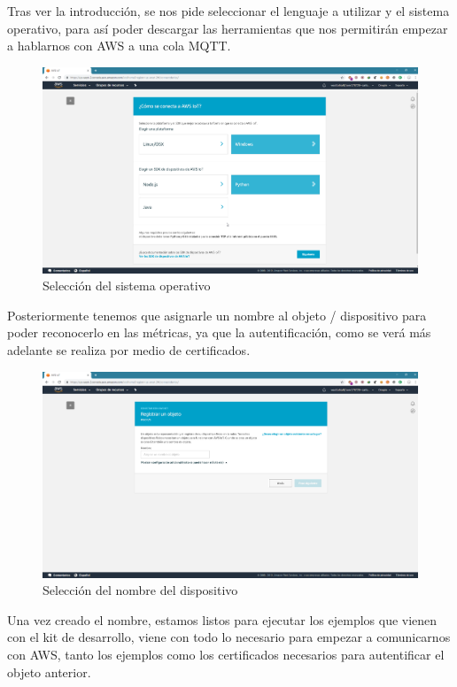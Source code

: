 Tras ver la introducción, se nos pide seleccionar el lenguaje a utilizar y el sistema operativo, para así poder descargar las herramientas que nos permitirán empezar a hablarnos con AWS a una cola MQTT.

\begin{figure}[h]
	\centering
	\includegraphics[scale=0.27]{iot_aws/creacion2.png}
	\caption{Selección del sistema operativo}
	\label{AWSIOT2}
\end{figure}

\newpage
Posteriormente tenemos que asignarle un nombre al objeto / dispositivo para poder reconocerlo en las métricas, ya que la autentificación, como se verá más adelante se realiza por medio de certificados.

\begin{figure}[h]
	\centering
	\includegraphics[scale=0.27]{iot_aws/creacion3.png}
	\caption{Selección del nombre del dispositivo}
	\label{AWSIOT3}
\end{figure}

Una vez creado el nombre, estamos listos para ejecutar los ejemplos que vienen con el kit de desarrollo, viene con todo lo necesario para empezar a comunicarnos con AWS, tanto los ejemplos como los certificados necesarios para autentificar el objeto anterior.


